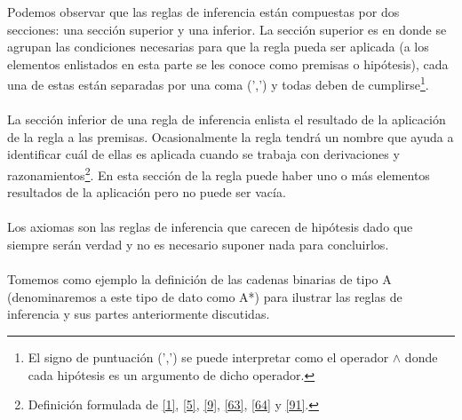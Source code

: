     Podemos observar que las reglas de inferencia están compuestas por dos secciones: una sección superior y una inferior. 
    La sección superior es en donde se agrupan las condiciones necesarias para que la regla pueda ser aplicada (a los elementos enlistados en esta parte se les conoce como premisas o hipótesis), cada una de estas están separadas por una coma (',') y todas deben de cumplirse\footnote{El signo de puntuación (',') se puede interpretar como el operador $\wedge$ donde cada hipótesis es un argumento de dicho operador.}. \\\\
    La sección inferior de una regla de inferencia enlista el resultado de la aplicación de la regla a las premisas. Ocasionalmente la regla tendrá un nombre que ayuda a identificar cuál de ellas es aplicada cuando se trabaja con derivaciones y razonamientos\footnote{Definición formulada de \hyperlink{1}{[1]}, \hyperlink{5}{[5]}, \hyperlink{9}{[9]}, \hyperlink{63}{[63]}, \hyperlink{64}{[64]} y \hyperlink{91}{[91]}.}. En esta sección de la regla puede haber uno o más elementos resultados de la aplicación pero no puede ser vacía. \\\\
    Los axiomas son las reglas de inferencia que carecen de hipótesis dado que siempre serán verdad y no es necesario suponer nada para concluirlos.\\\\
    Tomemos como ejemplo la definición de las cadenas binarias de tipo A (denominaremos a este tipo de dato como A*) para ilustrar las reglas de inferencia y sus partes anteriormente discutidas.

\bigskip

